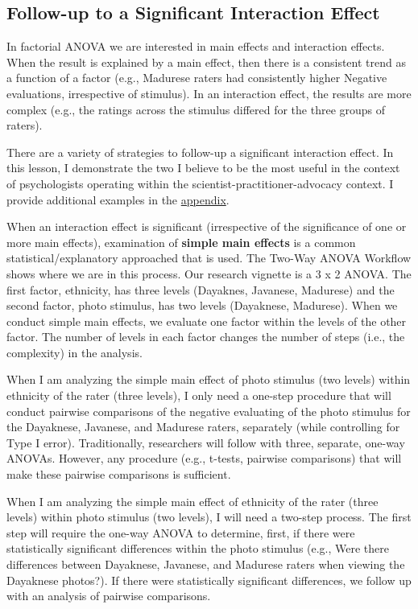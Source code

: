 \documentclass[
  11pt,
]{book}
\begin{document}
\hypertarget{follow-up-to-a-significant-interaction-effect}{%
\subsection{Follow-up to a Significant Interaction Effect}\label{follow-up-to-a-significant-interaction-effect}}

In factorial ANOVA we are interested in main effects and interaction effects. When the result is explained by a main effect, then there is a consistent trend as a function of a factor (e.g., Madurese raters had consistently higher Negative evaluations, irrespective of stimulus). In an interaction effect, the results are more complex (e.g., the ratings across the stimulus differed for the three groups of raters).

There are a variety of strategies to follow-up a significant interaction effect. In this lesson, I demonstrate the two I believe to be the most useful in the context of psychologists operating within the scientist-practitioner-advocacy context. I provide additional examples in the \protect\hyperlink{moRe}{appendix}.

When an interaction effect is significant (irrespective of the significance of one or more main effects), examination of \textbf{simple main effects} is a common statistical/explanatory approached that is used. The Two-Way ANOVA Workflow shows where we are in this process. Our research vignette is a 3 x 2 ANOVA. The first factor, ethnicity, has three levels (Dayaknes, Javanese, Madurese) and the second factor, photo stimulus, has two levels (Dayaknese, Madurese). When we conduct simple main effects, we evaluate one factor within the levels of the other factor. The number of levels in each factor changes the number of steps (i.e., the complexity) in the analysis.

When I am analyzing the simple main effect of photo stimulus (two levels) within ethnicity of the rater (three levels), I only need a one-step procedure that will conduct pairwise comparisons of the negative evaluating of the photo stimulus for the Dayaknese, Javanese, and Madurese raters, separately (while controlling for Type I error). Traditionally, researchers will follow with three, separate, one-way ANOVAs. However, any procedure (e.g., t-tests, pairwise comparisons) that will make these pairwise comparisons is sufficient.

When I am analyzing the simple main effect of ethnicity of the rater (three levels) within photo stimulus (two levels), I will need a two-step process. The first step will require the one-way ANOVA to determine, first, if there were statistically significant differences within the photo stimulus (e.g., Were there differences between Dayaknese, Javanese, and Madurese raters when viewing the Dayaknese photos?). If there were statistically significant differences, we follow up with an analysis of pairwise comparisons.
\end{document}
